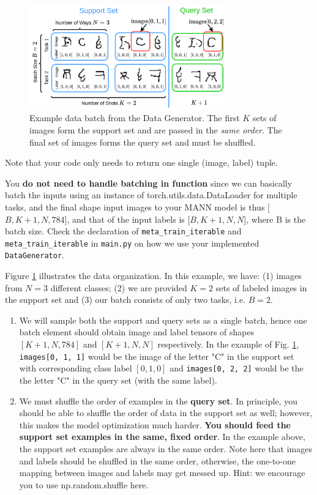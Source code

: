 \documentclass[12pt]{article}
\begin{document}
\begin{figure}
    \centering
    \includegraphics[width = 0.75\textwidth]{figures/hw1_batch_v4.png}
    \vspace{-0.3cm}
    \caption{\small Example data batch from the Data Generator. The first $K$ sets of images form the support set and are passed in the \emph{same order}. The final set of images forms the query set and must be shuffled.}
    \label{fig:batch}
\end{figure}
Note that your code only needs to return one single (image, label) tuple. 

You \textbf{do not need to handle batching in function} since we can basically batch the inputs using an instance of torch.utils.data.DataLoader for multiple tasks, and the final shape input images to your MANN model is thus [$B, K+1, N, 784$], and that of the input labels is [$B, K+1, N, N$], where B is the batch size. Check the declaration of \texttt{meta\_train\_iterable} and \texttt{meta\_train\_iterable} in \texttt{main.py} on how we use your implemented \texttt{DataGenerator}. 

Figure \ref{fig:batch} illustrates the data organization. In this example, we have: (1) images from $N=3$ different classes; (2) we are provided $K=2$ sets of labeled images in the support set and (3) our batch consists of only two tasks, i.e. $B=2$. 
\begin{enumerate}
    \item We will sample both the support and query sets as a single batch, hence one batch element should obtain image and label tensors of shapes $[K+1, N, 784]$  and $[K+1, N, N]$ respectively. In the example of Fig. \ref{fig:batch}, \texttt{images[0, 1, 1]} would be the image of the letter "C" in the support set with corresponding class label $[0, 1, 0]$ and \texttt{images[0, 2, 2]} would be the the letter "C" in the query set (with the same label).

    \item We must shuffle the order of examples in the \textbf{query set}. In principle, you should be able to shuffle the order of data in the support set as well; however, this makes the model optimization much harder. \textbf{You should feed the support set examples in the same, fixed order}. In the example above, the support set examples are always in the same order. Note here that images and labels should be shuffled
    in the same order, otherwise, the one-to-one mapping between images
    and labels may get messed up. Hint: we encourage you to use np.random.shuffle here.

\end{enumerate}
\end{document}
